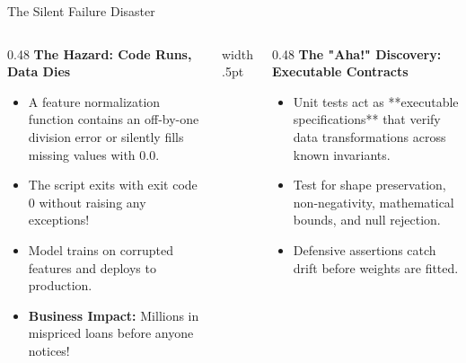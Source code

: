 \documentclass[../m00-session-04.tex]{subfiles}
\begin{document}
\begin{frame}[fragile]{The Silent Failure Disaster}
  \begin{columns}[T,onlytextwidth]
    \begin{column}{0.48\textwidth}
      {\small\bfseries\color{UpGradRed}The Hazard: Code Runs, Data Dies}\par\vspace{0.08cm}
      \begin{itemize}\setlength{\itemsep}{0.20em}\small
        \item A feature normalization function contains an off-by-one division error or silently fills missing values with $0.0$.
        \item The script exits with exit code 0 without raising any exceptions!
        \item Model trains on corrupted features and deploys to production.
        \item \textcolor{UpGradRed}{\textbf{Business Impact:}} Millions in mispriced loans before anyone notices!
      \end{itemize}
    \end{column}
    \hfill{\color{UpGradRule}\vrule width .5pt}\hfill
    \begin{column}{0.48\textwidth}
      {\small\bfseries\color{AWSEmerald}The "Aha!" Discovery: Executable Contracts}\par\vspace{0.08cm}
      \begin{itemize}\setlength{\itemsep}{0.18em}\small
        \item Unit tests act as **executable specifications** that verify data transformations across known invariants.
        \item Test for shape preservation, non-negativity, mathematical bounds, and null rejection.
        \item Defensive assertions catch drift before weights are fitted.
      \end{itemize}
      \vspace{0.04cm}
    \end{column}
  \end{columns}
\end{frame}
\end{document}
